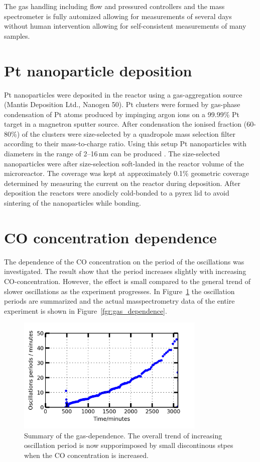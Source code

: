 \documentclass[8.5pt,twoside,twocolumn]{article}
\begin{document}
The gas handling including flow and pressured controllers and the mass spectrometer is fully automized allowing for measurements of several days without human intervention allowing for self-consistent measurements of many samples.

\section{Pt nanoparticle deposition}
Pt nanoparticles were deposited in the reactor using a gas-aggregation source (Mantis Deposition Ltd., Nanogen 50). Pt clusters were formed by gas-phase condensation of Pt atoms produced by impinging argon ions on a 99.99\% Pt target in a magnetron sputter source. After condensation the ionised fraction (60-80\%) of the clusters were size-selected by a quadropole mass selection filter according to their mass-to-charge ratio. Using this setup Pt nanoparticles with diameters in the range of 2--16\,nm can be produced \cite{Nielsen2010,Nielsen2009}. The size-selected nanoparticles were after size-selection soft-landed in the reactor volume of the microreactor. The coverage was kept at approximately 0.1\% geometric coverage determined by measuring the current on the reactor during deposition. After deposition the reactors were anodicly cold-bonded \cite{Vesborg2010} to a pyrex lid to avoid sintering of the nanoparticles while bonding.

\section{CO concentration dependence}
The dependence of the CO concentration on the period of the oscillations was investigated. The result show that the period increases slightly with increasing CO-concentration. However, the effect is small compared to the general trend of slower oscillations as the experiment progresses. In Figure~\ref{fgr:gas_dependence_summary} the oscillation periods are summarized and the actual masspectrometry data of the entire experiment is shown in Figure~\ref{fgr:gas_dependence}.

\begin{figure}[h]
  \centering
  \includegraphics[width=9cm]{oscillations_gas_dependence_summary_supplemental.png}
  \caption{Summary of the gas-dependence. The overall trend of increasing oscillation period is now supporimposed by small discontinous stpes when the CO concentration is increased.}
  \label{fgr:gas_dependence_summary}
\end{figure}
\end{document}
